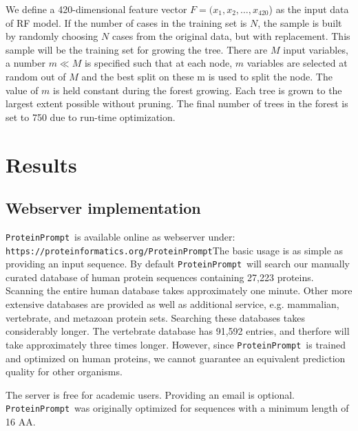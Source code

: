 \documentclass[3p,times,twocolumn]{elsarticle}
\newcommand{\TODO}[1] {\begingroup\color{red}#1\endgroup}
\newcommand{\url}[1]{\texttt{https://\small #1}}
\newcommand{\tool}{\texttt{ProteinPrompt}}
\newcommand{\website}{\url{proteinformatics.org/\tool}}
\begin{document}
We define a 420-dimensional feature vector $F=(x_1,x_2,
\dots,x_{420}$) as the input data of RF model. If the number of cases
in the training set is $N$, the sample is built by randomly choosing
$N$ cases from the original data, but with replacement. This sample
will be the training set for growing the tree. There are $M$ input
variables, a number $m \ll M$ is specified such that at each node, $m$
variables are selected at random out of $M$ and the best split on
these m is used to split the node. The value of $m$ is held constant
during the forest growing. Each tree is grown to the largest extent
possible without pruning. The final number of trees in the forest is
set to 750 due to run-time optimization. 





\section{Results}

\subsection{Webserver implementation}

\tool\  is available online as webserver under: \website The basic usage
is as simple as providing an input sequence. By default \tool\  will
search our manually curated database of human protein sequences
containing 27,223 proteins. Scanning the entire human database takes
approximately one minute. Other more extensive databases are provided
as well as additional service, e.g. mammalian, vertebrate, and
metazoan protein sets. Searching these databases takes considerably
longer.
The vertebrate database has 91,592 entries, and therfore will take approximately three times longer.
However, since \tool\ is trained and optimized
on human proteins, we cannot guarantee an equivalent prediction
quality for other organisms. 

The server is free for academic users. Providing an email is
optional.
\tool\ was originally optimized for sequences with a minimum length of 16 AA.

%
\end{document}
